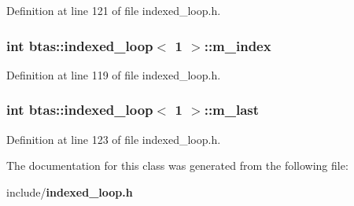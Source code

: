 Definition at line 121 of file indexed\-\_\-loop.\-h.

\subsubsection[{m\-\_\-index}]{\setlength{\rightskip}{0pt plus 5cm}int {\bf btas\-::indexed\-\_\-loop}$<$ 1 $>$\-::m\-\_\-index\hspace{0.3cm}{\ttfamily [private]}}\label{d7/d39/classbtas_1_1indexed__loop_3_011_01_4_a311f84ab1d0b869259e3545bfc9c540c}


Definition at line 119 of file indexed\-\_\-loop.\-h.

\subsubsection[{m\-\_\-last}]{\setlength{\rightskip}{0pt plus 5cm}int {\bf btas\-::indexed\-\_\-loop}$<$ 1 $>$\-::m\-\_\-last\hspace{0.3cm}{\ttfamily [private]}}\label{d7/d39/classbtas_1_1indexed__loop_3_011_01_4_a8d50709c833bf8e0252d4e3319655909}


Definition at line 123 of file indexed\-\_\-loop.\-h.



The documentation for this class was generated from the following file\-:\begin{DoxyCompactItemize}
\item 
include/{\bf indexed\-\_\-loop.\-h}\end{DoxyCompactItemize}

